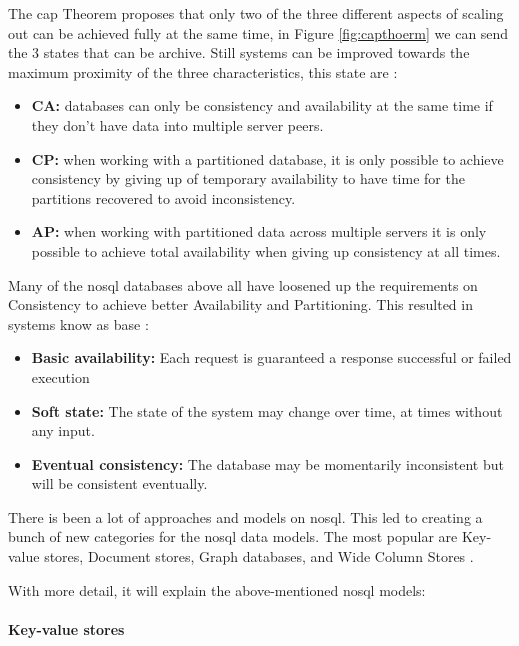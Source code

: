The \gls{cap} Theorem proposes that only two of the three different aspects of scaling out can be achieved fully at the same time, in Figure \ref{fig:capthoerm} we can send the 3 states that can be archive. Still systems can be improved towards the maximum proximity of the three characteristics, this state are \cite{ericcap12,cattell2011scalable,10.1145/289.291,brewer2000towards}:

\begin{itemize}
    \item \textbf{CA:} databases can only be consistency and availability at the same time if they don't have data into multiple server peers.
    \item \textbf{CP:} when working with a partitioned database, it is only possible to achieve consistency by giving up of temporary availability to have time for the partitions recovered to avoid inconsistency.
    \item \textbf{AP:} when working with partitioned data across multiple servers it is only possible to achieve total availability when giving up consistency at all times.
\end{itemize}



Many of the \gls{nosql} databases above all have loosened up the requirements on Consistency to achieve better Availability and Partitioning. This resulted in systems know as \gls{base}  \cite{base,cattell2011scalable,Startednosql}:
\begin{itemize}
    \item \textbf{Basic availability:} Each request is guaranteed a response successful or failed execution
    \item \textbf{Soft state:} The state of the system may change over time, at times without any input.
    \item \textbf{Eventual consistency:} The database may be momentarily inconsistent but will be consistent eventually.
\end{itemize}


There is been a lot of approaches and models on \gls{nosql}. This led to creating a bunch of new categories for the \gls{nosql} data models. The most popular are Key-value stores, Document stores, Graph databases, and Wide Column Stores \cite{nosqlchoose,5410700,li2013performance}.

With more detail, it will explain the above-mentioned \gls{nosql} models:


\paragraph{Key-value stores}

